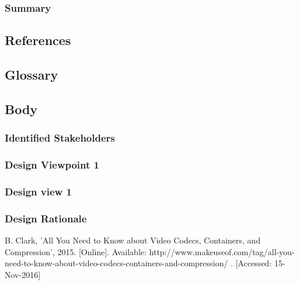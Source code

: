 \documentclass[letterpaper,10pt,onecolumn,draftclsnofoot]{IEEEtran}
\begin{document}
\subsubsection{Summary}

\subsection{References}
\subsection{Glossary}
\subsection{Body}
\subsubsection{Identified Stakeholders}
\subsubsection{Design Viewpoint 1}
\subsubsection{Design view 1}
\subsubsection{Design Rationale}


\newpage
\begin{thebibliography}{99}
B. Clark, 'All You Need to Know about Video Codecs, Containers, and Compression', 2015. [Online]. Available: http://www.makeuseof.com/tag/all-you-need-to-know-about-video-codecs-containers-and-compression/ . [Accessed: 15-Nov-2016]

\end{thebibliography}
\end{document}
